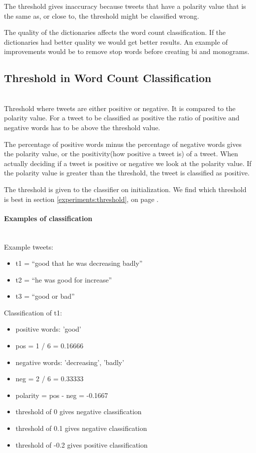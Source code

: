 The threshold gives inaccuracy because tweets that have a polarity value that
is the same as, or close to, the threshold might be classified wrong. 

The quality of the dictionaries affects the word count classification. If the
dictionaries had better quality we would get better results. An example of
improvements would be to remove stop words before creating bi and monograms.

\subsection{Threshold in Word Count Classification}\label{sentiment:threshold} 
\hspace{0pt}\\ 

Threshold where tweets are either positive or negative. It is compared
to the polarity value. For a tweet to be classified as positive the ratio of
positive and negative words has to be above the threshold value. 

The percentage of positive words minus the percentage of negative words gives
the polarity value, or the positivity(how positive a tweet is) of a tweet. 
When actually deciding if a tweet is positive or negative we look at the
polarity value. If the polarity value is greater than the threshold, the tweet is classified as positive. 

The threshold is given to the classifier on initialization. We find which
threshold is best in section \ref{experiments:threshold}, on page 
\pageref{experiments:threshold}.

\paragraph{Examples of classification} 
\hspace{0pt}\\ 
Example tweets:
\begin{itemize}
    \item t1 = “good that he was decreasing badly”
    \item t2 = “he was good for increase” 
    \item t3 = “good or bad”
\end{itemize}

Classification of t1:
\begin{itemize}
	\item positive words: 'good' 
    \item pos = 1 / 6 = 0.16666
	\item negative words: 'decreasing', 'badly'
    \item neg = 2 / 6 = 0.33333
    \item polarity = pos - neg = -0.1667
    \item threshold of 0 gives negative classification
    \item threshold of 0.1 gives negative classification
    \item threshold of -0.2 gives positive classification
\end{itemize}

